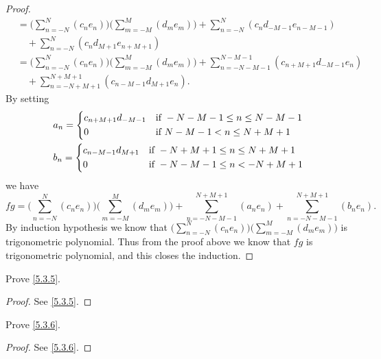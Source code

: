 \begin{proof}
\begin{align*}
        & = \bigg(\sum_{n = -N}^N (c_n e_n)\bigg) \bigg(\sum_{m = -M}^M (d_m e_m)\bigg) + \sum_{n = -N}^N (c_n d_{-M - 1} e_{n - M - 1})                   \\
        & \quad + \sum_{n = -N}^N (c_n d_{M + 1} e_{n + M + 1})                                                                                            \\
        & = \bigg(\sum_{n = -N}^N (c_n e_n)\bigg) \bigg(\sum_{m = -M}^M (d_m e_m)\bigg) + \sum_{n = -N - M - 1}^{N - M - 1} (c_{n + M + 1} d_{-M - 1} e_n) \\
        & \quad + \sum_{n = -N + M + 1}^{N + M + 1} (c_{n - M - 1} d_{M + 1} e_n).
  \end{align*}
  By setting
  \begin{align*}
     & a_n = \begin{dcases}
               c_{n + M + 1} d_{-M - 1} & \text{if } -N - M - 1 \leq n \leq N - M - 1 \\
               0                        & \text{if } N - M - 1 < n \leq N + M + 1
             \end{dcases} \\
     & b_n = \begin{dcases}
               c_{n - M - 1} d_{M + 1} & \text{if } -N + M + 1 \leq n \leq N + M + 1 \\
               0                       & \text{if } -N - M - 1 \leq n < -N + M + 1
             \end{dcases}
  \end{align*}
  we have
  \[
    fg = \bigg(\sum_{n = -N}^N (c_n e_n)\bigg) \bigg(\sum_{m = -M}^M (d_m e_m)\bigg) + \sum_{n = -N - M - 1}^{N + M + 1} (a_n e_n) + \sum_{n = -N - M - 1}^{N + M + 1} (b_n e_n).
  \]
  By induction hypothesis we know that \(\bigg(\sum_{n = -N}^N (c_n e_n)\bigg) \bigg(\sum_{m = -M}^M (d_m e_m)\bigg)\) is trigonometric polynomial.
  Thus from the proof above we know that \(fg\) is trigonometric polynomial, and this closes the induction.
\end{proof}

\begin{ex}\label{ex:5.3.2}
  Prove \cref{5.3.5}.
\end{ex}

\begin{proof}
  See \cref{5.3.5}.
\end{proof}

\begin{ex}\label{ex:5.3.3}
  Prove \cref{5.3.6}.
\end{ex}

\begin{proof}
  See \cref{5.3.6}.
\end{proof}